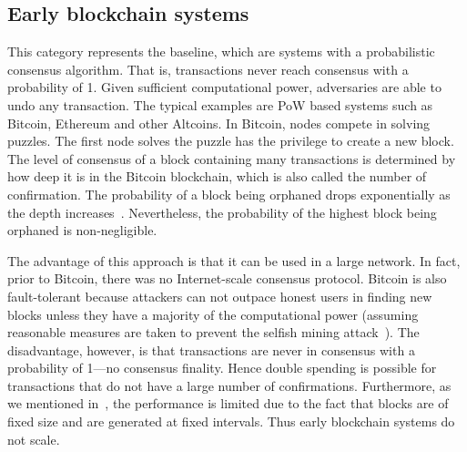 \subsection{Early blockchain systems}
This category represents the baseline,
which are systems with a probabilistic consensus algorithm.
That is, transactions never reach consensus with a probability of 1.
Given sufficient computational power, adversaries are able to undo any transaction.
The typical examples are PoW based systems such as Bitcoin, Ethereum and other Altcoins.
In Bitcoin, nodes compete in solving puzzles.
The first node solves the puzzle has the privilege to create a new block.
The level of consensus of a block containing many transactions is determined by how deep it is in the Bitcoin blockchain,
which is also called the number of confirmation.
The probability of a block being orphaned drops exponentially as the depth increases~\cite{bitcoin}.
Nevertheless, the probability of the highest block being orphaned is non-negligible.

The advantage of this approach is that it can be used in a large network.
In fact, prior to Bitcoin, there was no Internet-scale consensus protocol.
Bitcoin is also fault-tolerant because attackers can not outpace honest users in finding new blocks unless they have a majority of the computational power
(assuming reasonable measures are taken to prevent the selfish mining attack~\cite{eyal2014majority}).
The disadvantage, however, is that transactions are never in consensus with a probability of 1---no consensus finality.
Hence double spending is possible for transactions that do not have a large number of confirmations.
Furthermore, as we mentioned in~,
the performance is limited due to the fact that blocks are of fixed size and are generated at fixed intervals.
Thus early blockchain systems do not scale.


